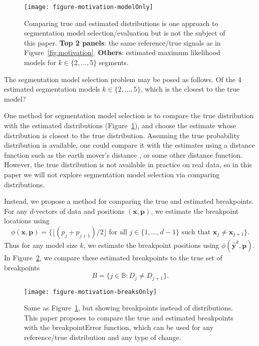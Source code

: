 \documentclass{jsfds} %
\begin{document}
\begin{figure}[H]
  \centering
  \texttt{[image: figure-motivation-modelOnly]}
  \vskip -0.5cm
  \caption{Comparing true and estimated distributions is one approach
    to segmentation model selection/evaluation but is not the subject
    of this paper. \textbf{Top 2 panels}: the same reference/true
    signals as in Figure~\ref{fig:motivation}. \textbf{Others}: estimated
    maximum likelihood models for $k\in\{2, \dots, 5\}$ segments.}
  \label{fig:motivation-modelOnly}
\end{figure}

\newpage

The segmentation model selection problem may be posed as follows. Of
the 4 estimated segmentation models $k\in\{2, \dots, 5\}$, which is
the closest to the true model?

One method for segmentation model selection is to compare the true
distribution with the estimated distributions
(Figure~\ref{fig:motivation-modelOnly}), and choose the estimate whose
distribution is closest to the true distribution. Assuming the true
probability distribution is available, one could compare it with the
estimates using a distance function such as the earth mover's distance
\citep{earth-mover}, or some other distance function. However, the
true distribution is not available in practice on real data, so in
this paper we will not explore segmentation model selection via
comparing distributions.

Instead, we propose a method for comparing the true and estimated
breakpoints. For any $d$-vectors of data and positions $(\mathbf x,
\mathbf p)$, we estimate the breakpoint locations using
\begin{equation}
  \label{eq:breaks_phi}
\phi(\mathbf{x}, \mathbf p)
= \big\{
\lfloor 
(p_j+p_{j+1})/2
\rfloor
\text{ for all }j\in\{1,\dots,d-1\}\text{ such that }
\mathbf x_j\neq \mathbf x_{j+1}
\big\}.
\end{equation}
Thus for any model size $k$, we estimate the breakpoint positions
using $\phi(\mathbf{\hat y}^k, \mathbf p)$.
In Figure~\ref{fig:motivation-breaksOnly}, we compare
these estimated breakpoints to the true set of breakpoints
\begin{equation}
  \label{eq:breaks_B}
  B = \{j\in\mathbb B:D_j\neq D_{j+1}\}.
\end{equation}

\begin{figure}[H]
  \centering
  \texttt{[image: figure-motivation-breaksOnly]}
  \vskip -0.5cm
  \caption{Same as Figure~\ref{fig:motivation-modelOnly}, but showing
    breakpoints instead of distributions. This paper proposes to
    compare the true and estimated breakpoints with the
    breakpointError function, which can be used for any reference/true
    distribution and any type of change. }
  \label{fig:motivation-breaksOnly}
\end{figure}
\end{document}
